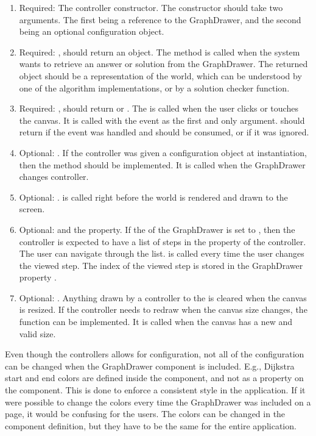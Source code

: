 \begin{enumerate}
    \item Required: The controller constructor. The constructor should take two arguments. The first being a reference to the GraphDrawer, and the second being an optional configuration object.
    \item Required: , should return an object. The  method is called when the system wants to retrieve an answer or solution from the GraphDrawer. The returned object should be a representation of the world, which can be understood by one of the algorithm implementations, or by a solution checker function.
    \item Required: , should return  or . The  is called when the user clicks or touches the canvas. It is called with the event as the first and only argument.  should return  if the event was handled and should be consumed, or  if it was ignored.
    \item Optional: . If the controller was given a configuration object at instantiation, then the  method should be implemented. It is called when the GraphDrawer changes controller.
    \item Optional: .  is called right before the world is rendered and drawn to the screen.
    \item Optional:  and the  property. If the  of the GraphDrawer is set to , then the controller is expected to have a list of steps in the  property of the controller. The user can navigate through the list.  is called every time the user changes the viewed step. The index of the viewed step is stored in the GraphDrawer property .
    \item Optional: . Anything drawn by a controller to the  is cleared when the canvas is resized. If the controller needs to redraw when the canvas size changes, the  function can be implemented. It is called when the canvas has a new and valid size. 
\end{enumerate}
Even though the controllers allows for configuration, not all of the configuration can be changed when the GraphDrawer component is included. E.g., Dijkstra start and end colors are defined inside the component, and not as a property on the component. This is done to enforce a consistent style in the application. If it were possible to change the colors every time the GraphDrawer was included on a page, it would be confusing for the users. The colors can be changed in the component definition, but they have to be the same for the entire application.

